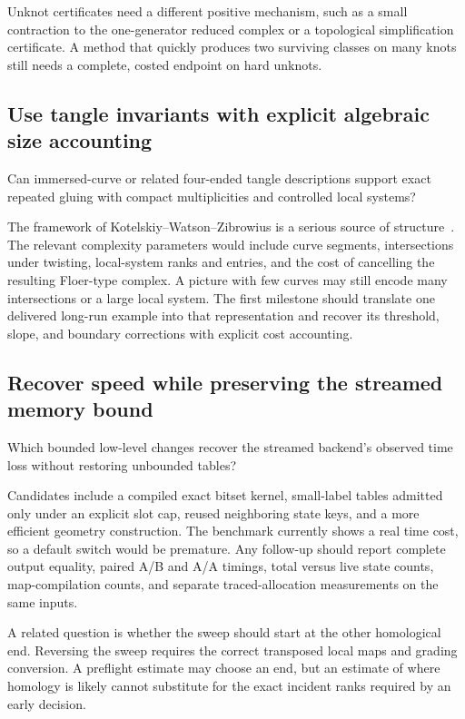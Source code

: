 Unknot certificates need a different positive mechanism, such as a
small contraction to the one-generator reduced complex or a
topological simplification certificate. A method that quickly produces
two surviving classes on many knots still needs a complete, costed
endpoint on hard unknots.

\subsection{Use tangle invariants with explicit algebraic size accounting}

\begin{question}\label{q:curves}
Can immersed-curve or related four-ended tangle descriptions support
exact repeated gluing with compact multiplicities and controlled local
systems?
\end{question}

The framework of Kotelskiy--Watson--Zibrowius is a serious source of
structure~\cite{kwz}. The relevant complexity parameters would include
curve segments, intersections under twisting, local-system ranks and
entries, and the cost of cancelling the resulting Floer-type complex.
A picture with few curves may still encode many intersections or a
large local system. The first milestone should translate one delivered
long-run example into that representation and recover its threshold,
slope, and boundary corrections with explicit cost accounting.

\subsection{Recover speed while preserving the streamed memory bound}

\begin{question}\label{q:streamspeed}
Which bounded low-level changes recover the streamed backend's observed
time loss without restoring unbounded tables?
\end{question}

Candidates include a compiled exact bitset kernel, small-label tables
admitted only under an explicit slot cap, reused neighboring state keys,
and a more efficient geometry construction.
The benchmark currently shows a real time cost, so a default switch
would be premature.
Any follow-up should report complete output equality, paired A/B and
A/A timings, total versus live state counts, map-compilation counts,
and separate traced-allocation measurements on the same inputs.

A related question is whether the sweep should start at the other
homological end. Reversing the sweep requires the correct transposed
local maps and grading conversion. A preflight estimate may choose an
end, but an estimate of where homology is likely cannot substitute
for the exact incident ranks required by an early decision.

